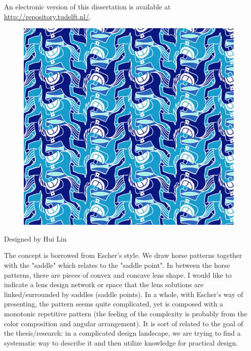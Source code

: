 \begin{titlepage}
\medskip
\noindent An electronic version of this dissertation is available at \\
\url{http://repository.tudelft.nl/}.

\newpage
\;
\vspace{12em}



\begin{figure}[h!]
    \centering
    \includegraphics[scale=0.35]{cover/CoverSP.png}
\end{figure} 
Designed by Hui Lin

 The concept is borrowed from Escher's style. We draw horse patterns together with the "saddle" which relates to the "saddle point". In between the horse patterns, there are pieces of convex and concave lens shape. I would like to indicate a lens design network or space that the lens solutions are linked/surrounded by saddles (saddle points). In a whole, with Escher's way of presenting, the pattern seems quite complicated, yet is composed with a monotonic repetitive pattern (the feeling of the complexity is probably from the color composition and angular arrangement). It is sort of related to the goal of the thesis/research: in a complicated design landscape, we are trying to find a systematic way to describe it and then utilize knowledge for practical design. 

\end{titlepage}

